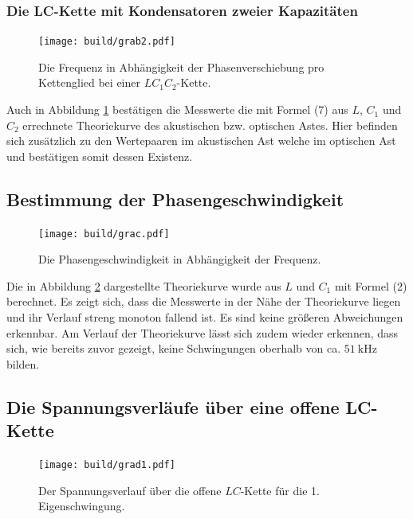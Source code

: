 \subsubsection{Die LC-Kette mit Kondensatoren zweier Kapazitäten}
\begin{figure}[H]
	\centering
	\caption{Die Frequenz in Abhängigkeit der Phasenverschiebung pro Kettenglied bei einer $LC_1C_2$-Kette.}
	\texttt{[image: build/grab2.pdf]}
	\label{fig:grab2}
\end{figure}

Auch in Abbildung \ref{fig:grab2} bestätigen die Messwerte die mit Formel (7) aus $L$, $C_1$ und $C_2$ errechnete Theoriekurve des akustischen bzw. optischen Astes. Hier befinden sich zusätzlich zu den Wertepaaren im akustischen Ast welche im optischen Ast und bestätigen somit dessen Existenz.

\subsection{Bestimmung der Phasengeschwindigkeit}

\begin{figure}[H]
	\centering
	\caption{Die Phasengeschwindigkeit in Abhängigkeit der Frequenz.}
	\texttt{[image: build/grac.pdf]}
	\label{fig:grac}
\end{figure}

Die in Abbildung \ref{fig:grac} dargestellte Theoriekurve wurde aus $L$ und $C_1$ mit Formel (2) berechnet.
Es zeigt sich, dass die Messwerte in der Nähe der Theoriekurve liegen und ihr Verlauf
 streng monoton fallend ist. Es sind keine größeren Abweichungen erkennbar. Am
  Verlauf der Theoriekurve lässt sich zudem wieder erkennen, dass sich, wie bereits zuvor
 gezeigt, keine Schwingungen oberhalb von ca. $\SI{51}{\kilo\hertz}$ bilden.

\subsection{Die Spannungsverläufe über eine offene LC-Kette}

\begin{figure}[H]
	\centering
	\caption{Der Spannungsverlauf über die offene $LC$-Kette für die 1. Eigenschwingung.}
	\texttt{[image: build/grad1.pdf]}
	\label{fig:grad1}
\end{figure}

